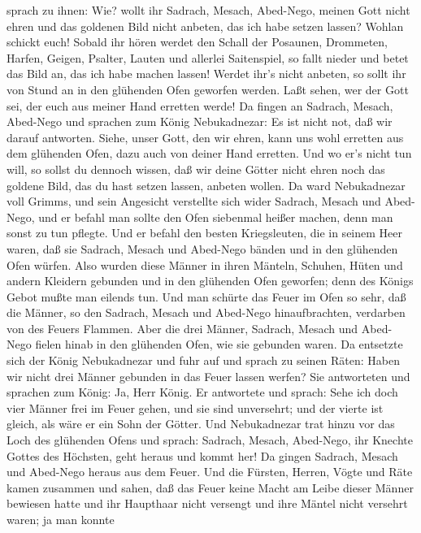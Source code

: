 sprach zu ihnen: Wie? wollt ihr Sadrach, Mesach, Abed-Nego, meinen Gott
nicht ehren und das goldenen Bild nicht anbeten, das ich habe setzen
lassen?  Wohlan schickt euch! Sobald ihr hören werdet den
Schall der Posaunen, Drommeten, Harfen, Geigen, Psalter, Lauten und
allerlei Saitenspiel, so fallt nieder und betet das Bild an, das ich
habe machen lassen! Werdet ihr's nicht anbeten, so sollt ihr von Stund
an in den glühenden Ofen geworfen werden. Laßt sehen, wer der Gott sei,
der euch aus meiner Hand erretten werde!  Da fingen an
Sadrach, Mesach, Abed-Nego und sprachen zum König Nebukadnezar: Es ist
nicht not, daß wir darauf antworten.  Siehe, unser Gott,
den wir ehren, kann uns wohl erretten aus dem glühenden Ofen, dazu auch
von deiner Hand erretten.  Und wo er's nicht tun will, so
sollst du dennoch wissen, daß wir deine Götter nicht ehren noch das
goldene Bild, das du hast setzen lassen, anbeten wollen. 
Da ward Nebukadnezar voll Grimms, und sein Angesicht verstellte sich
wider Sadrach, Mesach und Abed-Nego, und er befahl man sollte den Ofen
siebenmal heißer machen, denn man sonst zu tun pflegte. 
Und er befahl den besten Kriegsleuten, die in seinem Heer waren, daß sie
Sadrach, Mesach und Abed-Nego bänden und in den glühenden Ofen würfen.
 Also wurden diese Männer in ihren Mänteln, Schuhen, Hüten
und andern Kleidern gebunden und in den glühenden Ofen geworfen;
 denn des Königs Gebot mußte man eilends tun. Und man
schürte das Feuer im Ofen so sehr, daß die Männer, so den Sadrach,
Mesach und Abed-Nego hinaufbrachten, verdarben von des Feuers Flammen.
 Aber die drei Männer, Sadrach, Mesach und Abed-Nego fielen
hinab in den glühenden Ofen, wie sie gebunden waren.  Da
entsetzte sich der König Nebukadnezar und fuhr auf und sprach zu seinen
Räten: Haben wir nicht drei Männer gebunden in das Feuer lassen werfen?
Sie antworteten und sprachen zum König: Ja, Herr König.  Er
antwortete und sprach: Sehe ich doch vier Männer frei im Feuer gehen,
und sie sind unversehrt; und der vierte ist gleich, als wäre er ein Sohn
der Götter.  Und Nebukadnezar trat hinzu vor das Loch des
glühenden Ofens und sprach: Sadrach, Mesach, Abed-Nego, ihr Knechte
Gottes des Höchsten, geht heraus und kommt her! Da gingen Sadrach,
Mesach und Abed-Nego heraus aus dem Feuer.  Und die
Fürsten, Herren, Vögte und Räte kamen zusammen und sahen, daß das Feuer
keine Macht am Leibe dieser Männer bewiesen hatte und ihr Haupthaar
nicht versengt und ihre Mäntel nicht versehrt waren; ja man konnte
